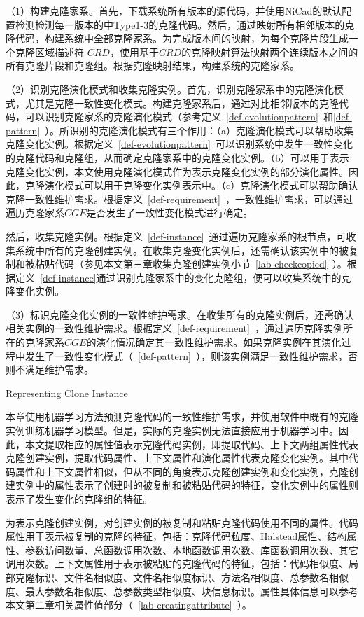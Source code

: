 （1）构建克隆家系。首先，下载系统所有版本的源代码，并使用NiCad的默认配置检测检测每一版本的中Type1-3的克隆代码。然后，通过映射所有相邻版本的克隆代码，构建系统中全部克隆家系。为完成版本间的映射，为每个克隆片段生成一个克隆区域描述符 $CRD$\cite{duala2010clone}，使用基于$CRD$的克隆映射算法映射两个连续版本之间的所有克隆片段和克隆组\cite{ci2013new}\cite{ci2013newD}。根据克隆映射结果，构建系统的克隆家系。

（2）识别克隆演化模式和收集克隆实例。首先，识别克隆家系中的克隆演化模式，尤其是克隆一致性变化模式。构建克隆家系后，通过对比相邻版本的克隆代码，可以识别克隆家系的克隆演化模式（参考定义~\ref{def-evolutionpattern}~和\ref{def-pattern}~）。所识别的克隆演化模式有三个作用：（a）克隆演化模式可以帮助收集克隆变化实例。根据定义~\ref{def-evolutionpattern}~可以识别系统中发生一致性变化的克隆代码和克隆组，从而确定克隆家系中的克隆变化实例。（b）可以用于表示克隆变化实例，本文使用克隆演化模式作为表示克隆变化实例的部分演化属性。因此，克隆演化模式可以用于克隆变化实例表示中。（c）克隆演化模式可以帮助确认克隆一致性维护需求。根据定义~\ref{def-requirement}~，一致性维护需求，可以通过遍历克隆家系$CGE$是否发生了一致性变化模式进行确定。

然后，收集克隆实例。根据定义~\ref{def-instance}~通过遍历克隆家系的根节点，可收集系统中所有的克隆创建实例。在收集克隆变化实例后，还需确认该实例中的被复制和被粘贴代码（参见本文第三章收集克隆创建实例小节~\ref{lab-checkcopied}~）。根据定义~\ref{def-instance}通过识别克隆家系中的变化克隆组，便可以收集系统中的克隆变化实例。

（3）标识克隆变化实例的一致性维护需求。在收集所有的克隆实例后，还需确认相关实例的一致性维护需求。根据定义~\ref{def-requirement}~，通过遍历克隆实例所在的克隆家系$CGE$的演化情况确定其一致性维护需求。如果克隆实例在其演化过程中发生了一致性变化模式（~\ref{def-pattern}~），则该实例满足一致性维护需求，否则不满足维护需求。

{Representing Clone Instance}

本章使用机器学习方法预测克隆代码的一致性维护需求，并使用软件中既有的克隆实例训练机器学习模型。但是，实际的克隆实例无法直接应用于机器学习中。因此，本文提取相应的属性值表示克隆代码实例，即提取代码、上下文两组属性代表克隆创建实例，提取代码属性、上下文属性和演化属性代表克隆变化实例。其中代码属性和上下文属性相似，但从不同的角度表示克隆创建实例和变化实例，克隆创建实例中的属性表示了创建时的被复制和被粘贴代码的特征，变化实例中的属性则表示了发生变化的克隆组的特征。

为表示克隆创建实例，对创建实例的被复制和粘贴克隆代码使用不同的属性。代码属性用于表示被复制的克隆的特征，包括：克隆代码粒度、Halstead属性、结构属性、参数访问数量、总函数调用次数、本地函数调用次数、库函数调用次数、其它调用次数。上下文属性用于表示被粘贴的克隆代码的特征，包括：代码相似度、局部克隆标识、文件名相似度、文件名相似度标识、方法名相似度、总参数名相似度、最大参数名相似度、总参数类型相似度、块信息标识。属性具体信息可以参考本文第二章相关属性值部分（~\ref{lab-creatingattribute}~）。

